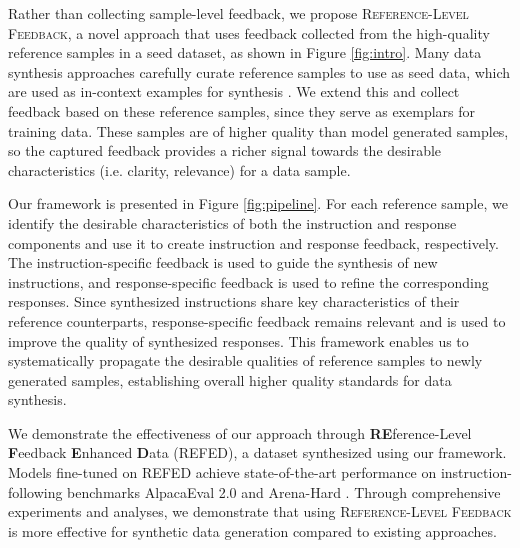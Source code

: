 Rather than collecting sample-level feedback, we propose \textsc{Reference-Level Feedback}, a novel approach that uses feedback collected from the high-quality reference samples in a seed dataset, as shown in Figure \ref{fig:intro}. Many data synthesis approaches carefully curate reference samples to use as seed data, which are used as in-context examples for synthesis \citep{wang-etal-2023-self-instruct, alpaca}. We extend this and collect feedback based on these reference samples, since they serve as exemplars for training data. These samples are of higher quality than model generated samples, so the captured feedback provides a richer signal towards the desirable characteristics (i.e. clarity, relevance) for a data sample.

Our framework is presented in Figure \ref{fig:pipeline}. For each reference sample, we identify the desirable characteristics of both the instruction and response components and use it to create instruction and response feedback, respectively. The instruction-specific feedback is used to guide the synthesis of new instructions, and response-specific feedback is used to refine the corresponding responses. Since synthesized instructions share key characteristics of their reference counterparts, response-specific feedback remains relevant and is used to improve the quality of synthesized responses. This framework enables us to systematically propagate the desirable qualities of reference samples to newly generated samples, establishing overall higher quality standards for data synthesis.

We demonstrate the effectiveness of our approach through \textbf{RE}ference-Level \textbf{F}eedback \textbf{E}nhanced \textbf{D}ata (\textsc{REFED}), a dataset synthesized using our framework. Models fine-tuned on \textsc{REFED} achieve state-of-the-art performance on instruction-following benchmarks AlpacaEval 2.0 \citep{dubois2024lengthcontrolledalpacaevalsimpleway} and Arena-Hard \citep{arenahard2024}. Through comprehensive experiments and analyses, we demonstrate that using \textsc{Reference-Level Feedback} is more effective for synthetic data generation compared to existing approaches.

